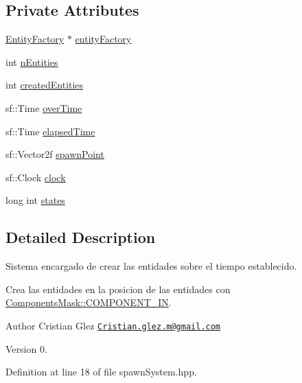 \subsection*{Private Attributes}
\begin{DoxyCompactItemize}
\item 
\hyperlink{classant_1_1_entity_factory}{Entity\+Factory} $\ast$ \hyperlink{classant_1_1spawn_system_aa6597a6902da56181752851938ce8356}{entity\+Factory}
\item 
int \hyperlink{classant_1_1spawn_system_ac15adf011d5664cfcecad025ece96c09}{n\+Entities}
\item 
int \hyperlink{classant_1_1spawn_system_af01da0544d6bcd40342b87eff15f0e28}{created\+Entities}
\item 
sf\+::\+Time \hyperlink{classant_1_1spawn_system_a5d716493bd70cb52490152d7075a490e}{over\+Time}
\item 
sf\+::\+Time \hyperlink{classant_1_1spawn_system_ad9cfddea638866f36562f0c02bf7b789}{elapsed\+Time}
\item 
sf\+::\+Vector2f \hyperlink{classant_1_1spawn_system_ae44b8fd02249453a7c4b4390bc7e32c7}{spawn\+Point}
\item 
sf\+::\+Clock \hyperlink{classant_1_1spawn_system_a0ab34f70ff78bd5082faf4555a40a729}{clock}
\item 
long int \hyperlink{classant_1_1spawn_system_a76dbde294f95b3aadd2b1df30699ebf1}{states}
\end{DoxyCompactItemize}


\subsection{Detailed Description}
Sistema encargado de crear las entidades sobre el tiempo establecido. 

Crea las entidades en la posicion de las entidades con \hyperlink{class_components_mask_a6a8d73981d65f39acb16bbeeced5a95b}{Components\+Mask\+::\+C\+O\+M\+P\+O\+N\+E\+N\+T\+\_\+\+I\+N}.

\begin{DoxyAuthor}{Author}
Cristian Glez \href{mailto:Cristian.glez.m@gmail.com}{\tt Cristian.\+glez.\+m@gmail.\+com} 
\end{DoxyAuthor}
\begin{DoxyVersion}{Version}
0. 
\end{DoxyVersion}


Definition at line 18 of file spawn\+System.\+hpp.



